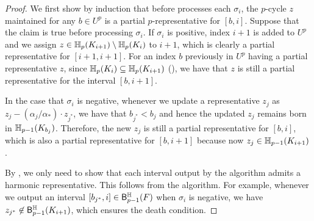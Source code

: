 \documentclass[10pt,a4paper]{amsart}
\newcommand {\mm}[1] {\ifmmode{#1}\else{\mbox{\(#1\)}}\fi}
\newcommand{\har}           {\mm{\mathbb{H}}}
\theoremstyle{definition}
\newcommand{\filt}{F}
\newcommand{\fsimp}{\sigma}
\newcommand{\hbarc}{\mathsf{B}^\har}
\newcommand{\aG}{\alpha}
\theoremstyle{remark}
\begin{document}
\begin{proof}
We first show by induction that before  processes each $\fsimp_i$, the $p$-cycle $z$ maintained for any $b\in U^p$ is a partial $p$-representative for $[b,i]$.
Suppose that the claim is true before processing $\fsimp_i$.
If $\fsimp_i$ is positive, index $i+1$ is added to $U^p$ and we assign $z \in\har_p(K_{i+1})\setminus\har_p(K_i)$ to $i+1$, which is clearly a partial representative for $[i+1,i+1]$.
For an index $b$ previously in $U^p$ having a partial representative $z$, since $\har_p(K_i)\subseteq \har_p(K_{i+1})$ (), we have that $z$ is still a partial representative for the interval $[b,i+1]$.

In the case that $\fsimp_i$ is negative, whenever we update a representative $z_j$ as $z_j-(\aG_j/\aG_*)\cdot z_{j^*}$, we have that $b_{j^*}<b_j$ and hence the updated $z_j$ remains born in $\har_{p-1}(K_{b_j})$. Therefore, the new $z_j$ is still a partial representative for $[b,i]$, which is also a partial representative for $[b,i+1]$ because now $z_j\in\har_{p-1}(K_{i+1})$.

By , we only need to show that each interval output by the algorithm admits a harmonic representative.
This follows from the algorithm. 
For example, whenever we output an interval $[b_{j^*},i]\in\hbarc_{p-1}(\filt)$ when $\fsimp_i$ is negative, we have $z_{j^*}\not\in\hbarc_{p-1}(K_{i+1})$, which ensures the death condition.
\end{proof}



% 

\let\mbeg\[
\let\mend\]


\end{document}
